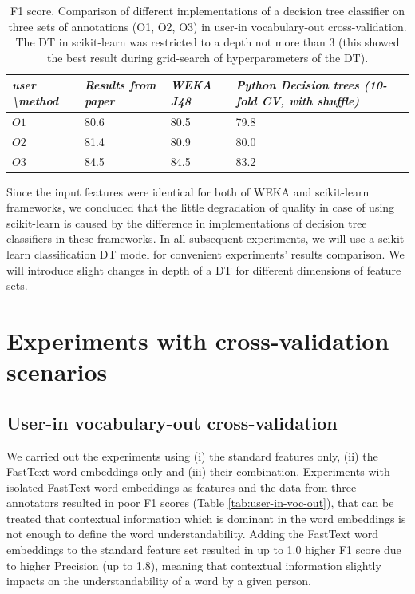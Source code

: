 \begin{table}[h]
\begin{tabular}{L|LLL}
\hline
\textit{user \textbackslash method} & \textit{Results from paper \citep{Grabar-PITR2014}} & \textit{WEKA J48} & \textit{Python Decision trees (10-fold CV, with shuffle)} \\ \hline
$O1$ & 80.6 & 80.5 & 79.8 \\
$O2$ & 81.4 & 80.9 & 80.0 \\
$O3$ & 84.5 & 84.5 & 83.2 \\ \hline
\end{tabular}
    \caption{F1 score. Comparison of different implementations of a decision tree classifier on three sets of annotations (O1, O2, O3) in user-in vocabulary-out cross-validation. The DT in scikit-learn was restricted to a depth not more than 3 (this showed the best result during grid-search of hyperparameters of the DT).}
    \label{tab:results-reproduction}
\end{table}

Since the input features were identical for both of WEKA and scikit-learn frameworks, we concluded that the little degradation of quality in case of using scikit-learn is caused by the difference in implementations of decision tree classifiers in these frameworks. In all subsequent experiments, we will use a scikit-learn classification DT model for convenient experiments' results comparison. We will introduce slight changes in depth of a DT for different dimensions of feature sets.


\section{Experiments with cross-validation scenarios}
\label{sec:cv-experiments}
\subsection{User-in vocabulary-out cross-validation}


We carried out the experiments using (i) the standard features only, (ii) the FastText word embeddings only and (iii) their combination. Experiments with isolated FastText word embeddings as features and the data from three annotators resulted in poor F1 scores (Table \ref{tab:user-in-voc-out}), that can be treated that contextual information which is dominant in the word embeddings is not enough to define the word understandability. Adding the FastText word embeddings to the standard feature set resulted in up to 1.0 higher F1 score due to higher Precision (up to 1.8), meaning that contextual information slightly impacts on the understandability of a word by a given person.

